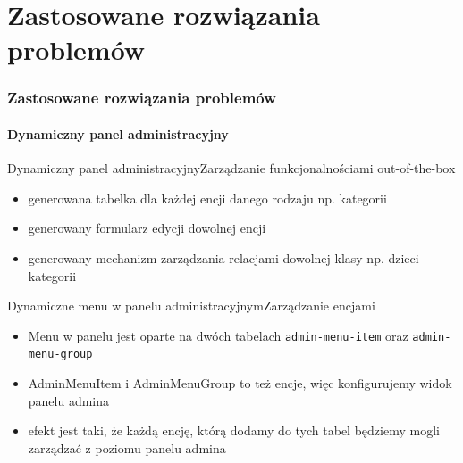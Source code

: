 \documentclass[polish,xcolor=table,9pt,aspectratio=1610,hyperref={pdfpagemode=FullScreen}]{beamer}
\begin{document}
\part{Zastosowane rozwiązania problemów}

\section{Zastosowane rozwiązania problemów}

\subsection{Dynamiczny panel administracyjny}

\begin{frame}{Dynamiczny panel administracyjny}{Zarządzanie funkcjonalnościami out-of-the-box}
	\begin{itemize}
		\item<1-> generowana tabelka dla każdej encji danego rodzaju np. kategorii 
		\item<1-> generowany formularz edycji dowolnej encji
		\item<1-> generowany mechanizm zarządzania relacjami dowolnej klasy np. dzieci kategorii
	\end{itemize}
	
\end{frame}

\begin{frame}{Dynamiczne menu w panelu administracyjnym}{Zarządzanie encjami}
\begin{itemize}
	\begin{exampleblock}{Przykład}
		Dodajemy nową klasę do systemu opartego na frameworku, chcemy mieć możliwość zarządzania tą klasą (operacje CRUD). Aby system widział tę klasę (i wszystkie ją rozszerzające) należy dodać rekord do tabeli \texttt{admin-menu-item} z nazwą klasy nowej encji. W ten sposób powstały wszystkie funkcjonalności \textit{out-of-the-box} 
	\end{exampleblock}
	\item<1-> Menu w panelu jest oparte na dwóch tabelach \texttt{admin-menu-item} oraz \texttt{admin-menu-group}
	\item<1-> AdminMenuItem i AdminMenuGroup to też encje, więc konfigurujemy widok panelu admina
	\item<1-> efekt jest taki, że każdą encję, którą dodamy do tych tabel będziemy mogli zarządzać z poziomu panelu admina
\end{itemize}
\end{frame}
\end{document}
